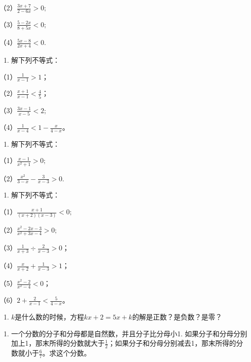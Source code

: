 （2）\(\frac{3x + 7}{2 - 6x} > 0;\)

（3）\(\frac{5 - 2x}{8 + 5x} < 0;\)

（4）\(\frac{5x - 8}{2x + 4} < 0.\)

\begin{enumerate}[start=2]
\item
  解下列不等式：
\end{enumerate}

（1）\(\frac{1}{x - 1} > 1\)；

（2）\(\frac{x + 1}{x - 1} < \frac{4}{5}\)；

（3）\(\frac{3x - 1}{x - 5} < 2;\)

（4）\(\frac{1}{x - 4} < 1 - \frac{x}{4 - x}\)。

\begin{enumerate}[start=3]
\item
  解下列不等式：
\end{enumerate}

（1）\(\frac{x - 1}{x^2 + 1} > 0;\)

（2）\(\frac{x^2}{3 - x} - \frac{3}{x - 3} > 0.\)

\begin{enumerate}[start=4]
\item
  解下列不等式：
\end{enumerate}

（1）\(\frac{x + 1}{(x + 2)(x - 3)} < 0;\)

（2）\(\frac{x^2 - 2x - 3}{x^2 + 3x - 4} > 0;\)

（3）\(\frac{1}{x + 3} \div \frac{2}{x - 3} > 0\)；

（4）\(\frac{x}{x + 2} + \frac{1}{x - 3} > 1\)；

（5）\(\frac{x^2 - 2}{x^2 - 4} < 0\)；

（6）\(2 + \frac{2}{x - 1} < \frac{5}{4 - x}\)。

\begin{enumerate}[start=5]
\item
  \(k\)是什么数的时候，方程\(kx + 2 = 5x + k\)的解是正数？是负数？是零？
\end{enumerate}

\begin{enumerate}[start=6]
\item
  一个分数的分子和分母都是自然数，并且分子比分母小1.
  如果分子和分母分别加上1，那末所得的分数就大于\(\frac{1}{2}\)；如果分子和分母分别减去1，那末所得的分数就小于\(\frac{6}{7}\)。求这个分数。
\end{enumerate}

